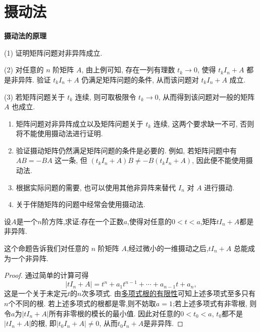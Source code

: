 \documentclass[../../main.tex]{subfiles}%
\begin{document}
\section{摄动法}
\textbf{摄动法的原理}

(1) 证明矩阵问题对非异阵成立.

(2) 对任意的 \(n\) 阶矩阵 \(A\), 由上例可知, 存在一列有理数 \(t_k\rightarrow0\), 使得 \(t_kI_n + A\) 都是非异阵. 验证 \(t_kI_n + A\) 仍满足矩阵问题的条件, 从而该问题对 \(t_kI_n + A\) 成立.

(3) 若矩阵问题关于 \(t_k\) 连续, 则可取极限令 \(t_k\rightarrow0\), 从而得到该问题对一般的矩阵 \(A\) 也成立.

\begin{remark}
\begin{enumerate}
\item 矩阵问题对非异阵成立以及矩阵问题关于 \(t_k\) 连续, 这两个要求缺一不可, 否则将不能使用摄动法进行证明.
\item 验证摄动矩阵仍然满足矩阵问题的条件是必要的. 例如, 若矩阵问题中有 \(AB=-BA\) 这一条, 但 \((t_kI_n + A)B\neq -B(t_kI_n + A)\), 因此便不能使用摄动法.
\item 根据实际问题的需要, 也可以使用其他非异阵来替代 \(I_n\) 对 \(A\) 进行摄动.

\item 关于伴随矩阵的问题中经常会使用摄动法.
\end{enumerate}
\end{remark}

\begin{proposition}\label{proposition:摄动法基本命题}
设\(A\)是一个\(n\)阶方阵,求证:存在一个正数\(a\),使得对任意的\(0 < t < a\),矩阵\(tI_n+A\)都是非异阵. 
\end{proposition}
\begin{remark}
这个命题告诉我们对任意的 \(n\) 阶矩阵 \(A\),经过微小的一维摄动之后,\(tI_n + A\) 总能成为一个非异阵.
\end{remark}
\begin{proof}

通过简单的计算可得
\[
|tI_n + A| = t^n + a_1t^{n - 1}+\cdots+a_{n - 1}t + a_n,
\]
这是一个关于未定元\(t\)的\(n\)次多项式. 由\hyperref[proposition:多项式根的有限性]{多项式根的有限性}可知上述多项式至多只有\(n\)个不同的根. 若上述多项式的根都是零,则不妨取\(a = 1\);若上述多项式有非零根, 则令\(a\)为\(|tI_n + A|\)所有非零根的模长的最小值. 因此对任意的\(0 < t_0 < a\), \(t_0\)都不是\(|tI_n + A|\)的根, 即\(|t_0I_n + A|\neq0\), 从而\(t_0I_n + A\)是非异阵.

\end{proof}
\end{document}
